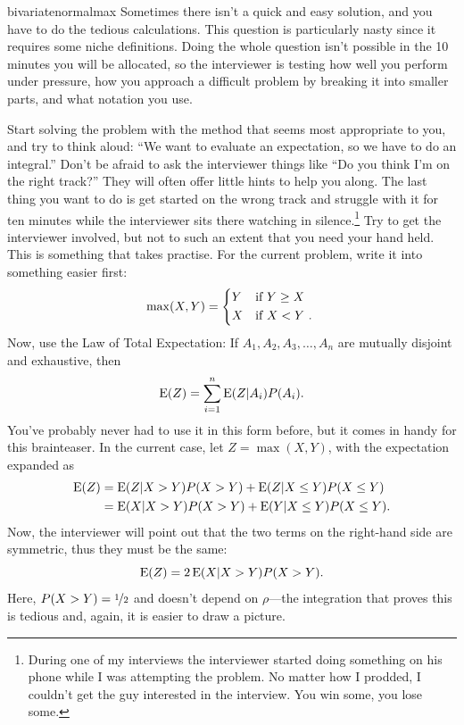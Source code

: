 \begin{answer}{bivariatenormalmax}
Sometimes there isn't a quick and easy solution, and you have to do the tedious calculations.
This question is particularly nasty since it requires some niche definitions.
Doing the whole question isn't possible in the 10 minutes you will be allocated, so the interviewer is testing how well you perform under pressure,
how you approach a difficult problem by breaking it into smaller parts,
and what notation you use.

Start solving the problem with the method that seems most appropriate to you, and try to think aloud:
``We want to evaluate an expectation, so we have to do an integral.''
Don't be afraid to ask the interviewer things like ``Do you think I'm on the right track?''
They will often offer little hints to help you along.
The last thing you want to do is get started on the wrong track and struggle with it for ten minutes while the interviewer sits there watching in silence.\footnote{During one of my interviews the interviewer started doing something on his phone while I was attempting the problem. No matter how I prodded, I couldn't get the guy interested in the interview. You win some, you lose some.}
Try to get the interviewer involved, but not to such an extent that you need your hand held.
This is something that takes practise.
For the current problem, write it into something easier first:
\[
  \max(X, Y) =
  \begin{dcases*}
    Y & if $Y \geq X$\\
    X & if $X < Y$
  \text{.}
  \end{dcases*}
\]
Now, use the Law of Total Expectation:
If $ A_1, A_2, A_3, \ldots, A_n$ are mutually disjoint and exhaustive, then
\[
  \operatorname{\mathrm{E}}(Z) = \sum_{i=1}^{n}{
    \operatorname{\mathrm{E}}(Z| A_i)P(A_i)
  }
  \text{.}
\]
You've probably never had to use it in this form before, but it comes in handy for this brainteaser.
In the current case, let $Z=\max(X,Y)$, with the expectation expanded as
\begin{align*}
  \operatorname{\mathrm{E}}(Z) &= \operatorname{\mathrm{E}}(Z|X > Y)P(X>Y)
+          \operatorname{\mathrm{E}}(Z|X \leq Y)P(X \leq Y) \\
        &= \operatorname{\mathrm{E}}(X|X > Y)P(X>Y)
+          \operatorname{\mathrm{E}}(Y|X \leq Y)P(X \leq Y)
  \text{.}
\end{align*}
Now, the interviewer will point out that the two terms on the right-hand side are symmetric, thus they must be the same:
\[
  \operatorname{\mathrm{E}}(Z) = 2 \operatorname{\mathrm{E}}(X|X > Y)P(X>Y)
  \text{.}
\]
Here, $P(X>Y) = \nicefrac{1}{2}$ and doesn't depend on $\rho$---the integration that proves this is tedious and, again, it is easier to draw a picture.

\end{answer}
